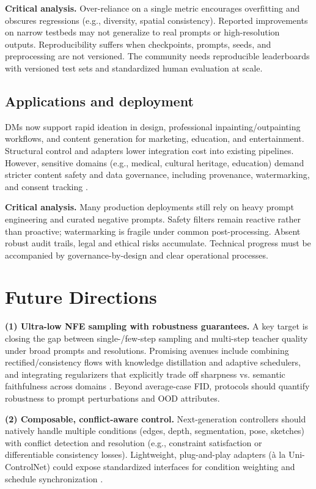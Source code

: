 \documentclass[conference]{IEEEtran}
\begin{document}
\textbf{Critical analysis.} Over-reliance on a single metric encourages overfitting and obscures regressions (e.g., diversity, spatial consistency). Reported improvements on narrow testbeds may not generalize to real prompts or high-resolution outputs. Reproducibility suffers when checkpoints, prompts, seeds, and preprocessing are not versioned. The community needs reproducible leaderboards with versioned test sets and standardized human evaluation at scale.

\subsection{Applications and deployment}
DMs now support rapid ideation in design, professional inpainting/outpainting workflows, and content generation for marketing, education, and entertainment. Structural control and adapters lower integration cost into existing pipelines. However, sensitive domains (e.g., medical, cultural heritage, education) demand stricter content safety and data governance, including provenance, watermarking, and consent tracking \cite{Zhang2023ControlNet,Chen2025ComprehensiveSurvey}. 

\textbf{Critical analysis.} Many production deployments still rely on heavy prompt engineering and curated negative prompts. Safety filters remain reactive rather than proactive; watermarking is fragile under common post-processing. Absent robust audit trails, legal and ethical risks accumulate. Technical progress must be accompanied by governance-by-design and clear operational processes.

\section{Future Directions}\label{sec:future}
\textbf{(1) Ultra-low NFE sampling with robustness guarantees.}
A key target is closing the gap between single-/few-step sampling and multi-step teacher quality under broad prompts and resolutions. Promising avenues include combining rectified/consistency flows with knowledge distillation and adaptive schedulers, and integrating regularizers that explicitly trade off sharpness vs. semantic faithfulness across domains \cite{Lee2024RectifiedArxiv}. Beyond average-case FID, protocols should quantify robustness to prompt perturbations and OOD attributes.

\textbf{(2) Composable, conflict-aware control.}
Next-generation controllers should natively handle multiple conditions (edges, depth, segmentation, pose, sketches) with conflict detection and resolution (e.g., constraint satisfaction or differentiable consistency losses). Lightweight, plug-and-play adapters (à la Uni-ControlNet) could expose standardized interfaces for condition weighting and schedule synchronization \cite{Zhao2023UniControlNet,Zhang2023ControlNet}.
\end{document}
